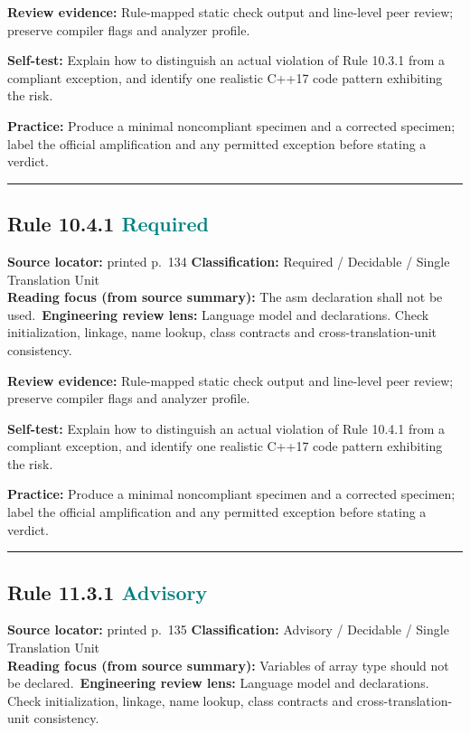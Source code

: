 \documentclass[10pt,letterpaper]{article}
\begin{document}
\textbf{Review evidence:} Rule-mapped static check output and line-level peer review; preserve compiler flags and analyzer profile.

\textbf{Self-test:} Explain how to distinguish an actual violation of Rule 10.3.1 from a compliant exception, and identify one realistic C++17 code pattern exhibiting the risk.\par
\textbf{Practice:} Produce a minimal noncompliant specimen and a corrected specimen; label the official amplification and any permitted exception before stating a verdict.
\smallskip\hrule\smallskip
\subsection*{Rule 10.4.1 \enspace \texorpdfstring{\small\textcolor{teal}{Required}}{Required}}
\noindent\textbf{Source locator:} printed p.~134 \quad\textbf{Classification:} Required / Decidable / Single Translation Unit\\
\textbf{Reading focus (from source summary):} The asm declaration shall not be used.\
\textbf{Engineering review lens:} Language model and declarations. Check initialization, linkage, name lookup, class contracts and cross-translation-unit consistency.

\textbf{Review evidence:} Rule-mapped static check output and line-level peer review; preserve compiler flags and analyzer profile.

\textbf{Self-test:} Explain how to distinguish an actual violation of Rule 10.4.1 from a compliant exception, and identify one realistic C++17 code pattern exhibiting the risk.\par
\textbf{Practice:} Produce a minimal noncompliant specimen and a corrected specimen; label the official amplification and any permitted exception before stating a verdict.
\smallskip\hrule\smallskip
\subsection*{Rule 11.3.1 \enspace \texorpdfstring{\small\textcolor{teal}{Advisory}}{Advisory}}
\noindent\textbf{Source locator:} printed p.~135 \quad\textbf{Classification:} Advisory / Decidable / Single Translation Unit\\
\textbf{Reading focus (from source summary):} Variables of array type should not be declared.\
\textbf{Engineering review lens:} Language model and declarations. Check initialization, linkage, name lookup, class contracts and cross-translation-unit consistency.
\end{document}

